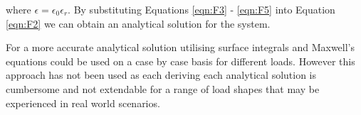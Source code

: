 where $\epsilon = \epsilon_0\epsilon_r$. By substituting Equations \ref{eqn:F3} - \ref{eqn:F5} into Equation \ref{eqn:F2} we can obtain an analytical solution for the system. 

For a more accurate analytical solution utilising surface integrals and Maxwell's equations could be used on a case by case basis for different loads. However this approach has not been used as each deriving each analytical solution is cumbersome and not extendable for a range of load shapes that may be experienced in real world scenarios.


